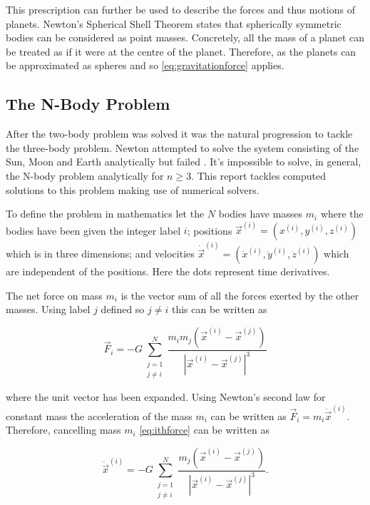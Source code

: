 \documentclass{physics_article_B}
\begin{document}
This prescription can further be used to describe the forces and thus motions of planets. Newton's Spherical Shell Theorem states that spherically symmetric bodies can be considered as point masses. Concretely, all the mass of a planet can be treated as if it were at the centre of the planet. Therefore, as the planets can be approximated as spheres and so \cref{eq:gravitationforce} applies.

\subsection{The N-Body Problem}
After the two-body problem was solved it was the natural progression to tackle the three-body problem. Newton attempted to solve the system consisting of the Sun, Moon and Earth analytically but failed \cite{hartle_gravity_2003}. It's impossible to solve, in general, the N-body problem analytically for $n\ge 3$. This report tackles computed solutions to this problem making use of numerical solvers.

To define the problem in mathematics let the $N$ bodies have masses $m_i$ where the bodies have been given the integer label $i$; positions $\vec{x}^{(i)} = (x^{(i)},y^{(i)}, z^{(i)})$ which is in three dimensions; and velocities $\dot{\vec{x}}^{(i)} = (\dot{x}^{(i)},\dot{y}^{(i)},\dot{z}^{(i)})$ which are independent of the positions. Here the dots represent time derivatives.

The net force on mass $m_i$ is the vector sum of all the forces exerted by the other masses. Using label $j$ defined so $j\neq i$ this can be written as

\begin{equation}
\vec{F}_i = -G\sum_{\substack{j=1\\j\neq i}}^N\frac{m_im_j(\vec{x}^{(i)} - \vec{x}^{(j)})}{|\vec{x}^{(i)} - \vec{x}^{(j)}|^3}
\label{eq:ithforce}
\end{equation}

where the unit vector has been expanded. Using Newton's second law for constant mass the acceleration of the mass $m_i$ can be written as $\vec{F}_i = m_i\ddot{\vec{x}}^{(i)}$. Therefore, cancelling mass $m_i$ \cref{eq:ithforce} can be written as

\begin{equation}
 \ddot{\vec{x}}^{(i)} = -G\sum_{\substack{j=1\\j\neq i}}^N\frac{m_j(\vec{x}^{(i)} - \vec{x}^{(j)})}{|\vec{x}^{(i)} - \vec{x}^{(j)}|^3}.
 \label{eq:vectormotion}
\end{equation}
\end{document}
